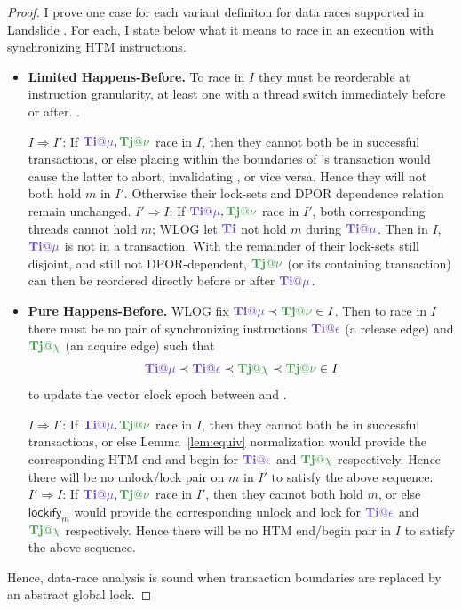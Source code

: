 \begin{proof}
I prove one case for each variant definiton for data races supported in Landslide \cite{quicksand}.
For each, I state below what it means to race in an execution with synchronizing HTM instructions.

\begin{itemize}
	\item {\bf Limited Happens-Before.}
		To race in $I$ they must be reorderable at instruction granularity,
		at least one with a thread switch immediately before or after.
		\cite{tsan,hybriddatarace}.
		\begin{itemize}
			\llitem $I \Rightarrow I'$:
				If $\tiiat{\mu},\tjjat{\nu}$ race in $I$,
				then they cannot both be in successful transactions,
				or else placing \tiiat{\mu} within the boundaries of \tjjat{\nu}'s transaction
				would cause the latter to abort, invalidating \tjjat{\nu}, or vice versa.
				Hence they will not both hold $m$ in $I'$.
				Otherwise their lock-sets and DPOR dependence relation remain unchanged.
			\llitem $I' \Rightarrow I$:
				If $\tiiat{\mu},\tjjat{\nu}$ race in $I'$,
				both corresponding threads cannot hold $m$;
				WLOG let $\tii$ not hold $m$ during $\tiiat{\mu}$.
				Then in $I$, $\tiiat{\mu}$ is not in a transaction.
				With the remainder of their lock-sets still disjoint,
				and still not DPOR-dependent, $\tjjat{\nu}$ (or its containing transaction)
				can then be reordered directly before or after $\tiiat{\mu}$.
		\end{itemize}
	\item {\bf Pure Happens-Before.}
		WLOG fix $\tiiat{\mu} \prec \tjjat{\nu} \in I$.
		Then to race in $I$ there must be no pair of synchronizing instructions
		$\tiiat{\epsilon}$ (a release edge) and $\tjjat{\chi}$ (an acquire edge) such that
		\[
			\tiiat{\mu} \prec \tiiat{\epsilon} \prec \tjjat{\chi} \prec \tjjat{\nu} \in I
		\]
		to update the vector clock epoch between \tiiat{\mu} and \tjjat{\nu} \cite{djit,fasttrack}.
		\begin{itemize}
			\llitem $I \Rightarrow I'$:
				If $\tiiat{\mu},\tjjat{\nu}$ race in $I$,
				then they cannot both be in successful transactions,
				or else Lemma~\ref{lem:equiv} normalization would provide
				the corresponding HTM end and begin for $\tiiat{\epsilon}$ and $\tjjat{\chi}$ respectively.
				Hence there will be no unlock/lock pair on $m$ in $I'$ to satisfy the above sequence.
			\llitem $I' \Rightarrow I$:
				If $\tiiat{\mu},\tjjat{\nu}$ race in $I'$,
				then they cannot both hold $m$,
				or else $\mathsf{lockify}_m$ would provide the corresponding
				unlock and lock for $\tiiat{\epsilon}$ and $\tjjat{\chi}$ respectively.
				Hence there will be no HTM end/begin pair in $I$ to satisfy the above sequence.
		\end{itemize}
\end{itemize}
Hence, data-race analysis is sound when transaction boundaries are replaced by an abstract global lock.
\end{proof}

